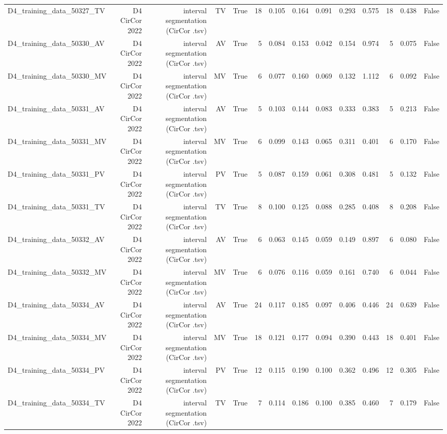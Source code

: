 \begin{table}[htbp]
\begin{tabular}{lrrrrrrrrrrrrr}
    D4\_training\_data\_50327\_TV & D4 CirCor 2022 & interval segmentation (CirCor .tsv) & TV & True & 18 & 0.105 & 0.164 & 0.091 & 0.293 & 0.575 & 18 & 0.438 & False \\
    D4\_training\_data\_50330\_AV & D4 CirCor 2022 & interval segmentation (CirCor .tsv) & AV & True & 5 & 0.084 & 0.153 & 0.042 & 0.154 & 0.974 & 5 & 0.075 & False \\
    D4\_training\_data\_50330\_MV & D4 CirCor 2022 & interval segmentation (CirCor .tsv) & MV & True & 6 & 0.077 & 0.160 & 0.069 & 0.132 & 1.112 & 6 & 0.092 & False \\
    D4\_training\_data\_50331\_AV & D4 CirCor 2022 & interval segmentation (CirCor .tsv) & AV & True & 5 & 0.103 & 0.144 & 0.083 & 0.333 & 0.383 & 5 & 0.213 & False \\
    D4\_training\_data\_50331\_MV & D4 CirCor 2022 & interval segmentation (CirCor .tsv) & MV & True & 6 & 0.099 & 0.143 & 0.065 & 0.311 & 0.401 & 6 & 0.170 & False \\
    D4\_training\_data\_50331\_PV & D4 CirCor 2022 & interval segmentation (CirCor .tsv) & PV & True & 5 & 0.087 & 0.159 & 0.061 & 0.308 & 0.481 & 5 & 0.132 & False \\
    D4\_training\_data\_50331\_TV & D4 CirCor 2022 & interval segmentation (CirCor .tsv) & TV & True & 8 & 0.100 & 0.125 & 0.088 & 0.285 & 0.408 & 8 & 0.208 & False \\
    D4\_training\_data\_50332\_AV & D4 CirCor 2022 & interval segmentation (CirCor .tsv) & AV & True & 6 & 0.063 & 0.145 & 0.059 & 0.149 & 0.897 & 6 & 0.080 & False \\
    D4\_training\_data\_50332\_MV & D4 CirCor 2022 & interval segmentation (CirCor .tsv) & MV & True & 6 & 0.076 & 0.116 & 0.059 & 0.161 & 0.740 & 6 & 0.044 & False \\
    D4\_training\_data\_50334\_AV & D4 CirCor 2022 & interval segmentation (CirCor .tsv) & AV & True & 24 & 0.117 & 0.185 & 0.097 & 0.406 & 0.446 & 24 & 0.639 & False \\
    D4\_training\_data\_50334\_MV & D4 CirCor 2022 & interval segmentation (CirCor .tsv) & MV & True & 18 & 0.121 & 0.177 & 0.094 & 0.390 & 0.443 & 18 & 0.401 & False \\
    D4\_training\_data\_50334\_PV & D4 CirCor 2022 & interval segmentation (CirCor .tsv) & PV & True & 12 & 0.115 & 0.190 & 0.100 & 0.362 & 0.496 & 12 & 0.305 & False \\
    D4\_training\_data\_50334\_TV & D4 CirCor 2022 & interval segmentation (CirCor .tsv) & TV & True & 7 & 0.114 & 0.186 & 0.100 & 0.385 & 0.460 & 7 & 0.179 & False \\

\end{tabular}
\end{table}
